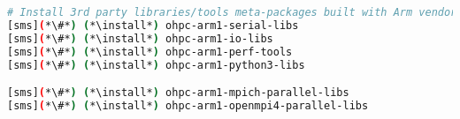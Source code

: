 \begin{lstlisting}[language=bash,keywords={},upquote=true,keepspaces]
# Install 3rd party libraries/tools meta-packages built with Arm vendor toolchain
[sms](*\#*) (*\install*) ohpc-arm1-serial-libs
[sms](*\#*) (*\install*) ohpc-arm1-io-libs
[sms](*\#*) (*\install*) ohpc-arm1-perf-tools
[sms](*\#*) (*\install*) ohpc-arm1-python3-libs

[sms](*\#*) (*\install*) ohpc-arm1-mpich-parallel-libs
[sms](*\#*) (*\install*) ohpc-arm1-openmpi4-parallel-libs
\end{lstlisting}


